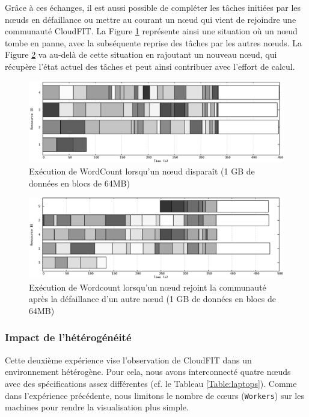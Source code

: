 Grâce à ces échanges, il est aussi possible de compléter les tâches initiées par les n{\oe}uds en défaillance ou mettre au courant un n{\oe}ud qui vient de rejoindre une communauté CloudFIT. La Figure \ref{fig:1out} représente ainsi une situation où un n{\oe}ud tombe en panne, avec la subséquente reprise des tâches par les autres n{\oe}uds. La Figure \ref{fig:reprise} va au-delà de cette situation en rajoutant un nouveau n{\oe}ud, qui récupère l'état actuel des tâches et peut ainsi contribuer avec l'effort de calcul.
\begin{figure}
	\centering
		\includegraphics[width=1\linewidth]{img/1out2}
		\caption{Exécution de WordCount lorsqu'un n{\oe}ud disparaît (1 GB de données en blocs de 64MB)}\label{fig:1out}
\end{figure}

\begin{figure}
	\centering
		\includegraphics[width=1\linewidth]{img/reprise2}
		\caption{Exécution de Wordcount lorsqu'un n{\oe}ud rejoint la communauté après la défaillance d'un autre n{\oe}ud (1 GB de données en blocs de 64MB)}\label{fig:reprise}
\end{figure}


\subsubsection{Impact de l'hétérogénéité}

Cette deuxième expérience vise l'observation de CloudFIT dans un environnement hétérogène. Pour cela, nous avons interconnecté quatre n{\oe}uds avec des spécifications assez différentes (cf. le Tableau \ref{Table:laptops}). Comme dans l'expérience précédente, nous limitons le nombre de c{\oe}urs (\texttt{Workers}) sur les machines pour rendre la visualisation plus simple.

